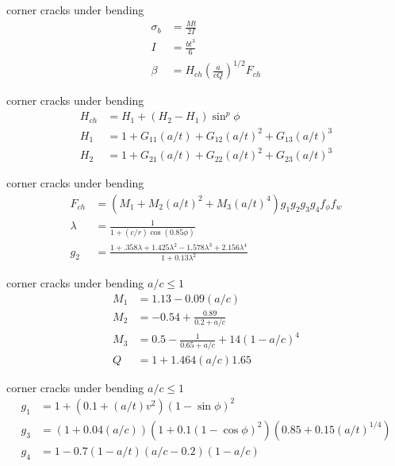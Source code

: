 \documentclass[
  letterpaper,
  ignorenonframetext,
  aspectratio=43,
  handout,
  12pt]{beamer}
\begin{document}
\begin{frame}{corner cracks under bending}
\protect\hypertarget{corner-cracks-under-bending}{}
\[\begin{aligned}
  \sigma_b &= \frac{Mt}{2 I}\\
  I &= \frac{bt^3}{6}\\
  \beta &= H_{ch} \left(\frac{a}{cQ}\right)^{1/2} F_{ch}
\end{aligned}\]
\end{frame}

\begin{frame}{corner cracks under bending}
\protect\hypertarget{corner-cracks-under-bending-1}{}
\[\begin{aligned}
  H_{ch} &= H_1 + (H_2 - H_1) \sin ^p \phi\\
  H_1 &= 1 + G_{11} (a/t) + G_{12} (a/t)^2 + G_{13} (a/t)^3\\
  H_2 &= 1 + G_21 (a/t) + G_{22}(a/t)^2 + G_{23}(a/t)^3
\end{aligned}\]
\end{frame}

\begin{frame}{corner cracks under bending}
\protect\hypertarget{corner-cracks-under-bending-2}{}
\[\begin{aligned}
  F_{ch} &= \left(M_1 + M_2(a/t)^2 + M_3(a/t)^4\right)g_1 g_2 g_3 g_4 f_\phi f_w\\
  \lambda &= \frac{1}{1 + (c/r) \cos (0.85 \phi)}\\
  g_2 &= \frac{1 + .358 \lambda + 1.425 \lambda^2 - 1.578 \lambda^3 + 2.156 \lambda^4}{1 + 0.13\lambda^2}
\end{aligned}\]
\end{frame}

\begin{frame}{corner cracks under bending \(a/c \le 1\)}
\protect\hypertarget{corner-cracks-under-bending-ac-le-1}{}
\[\begin{aligned}
  M_1 &= 1.13 - 0.09 (a/c)\\
  M_2 &= -0.54 + \frac{0.89}{0.2 + a/c}\\
  M_3 &= 0.5 - \frac{1}{0.65+a/c} + 14(1-a/c)^4\\
  Q &= 1 + 1.464(a/c)1.65
\end{aligned}\]
\end{frame}

\begin{frame}{corner cracks under bending \(a/c \le 1\)}
\protect\hypertarget{corner-cracks-under-bending-ac-le-1-1}{}
\[\begin{aligned}
  g_1 &= 1 + \left(0.1 + (a/t) v^2\right)\left(1-\sin \phi\right)^2\\
  g_3 &= \left(1+0.04 (a/c) \right)\left(1 + 0.1 \left(1-\cos \phi \right)^2\right)\left(0.85 + 0.15(a/t) ^{1/4}\right)\\
  g_4 &= 1 - 0.7 \left(1-a/t\right)\left(a/c - 0.2\right)\left(1-a/c\right)
\end{aligned}\]
\end{frame}
\end{document}
